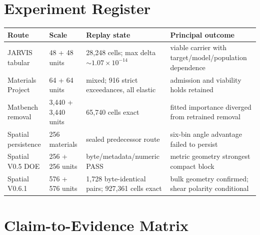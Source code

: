 \documentclass[11pt,a4paper,oneside]{report}
\begin{document}
\clearpage
\appendix

\chapter{Experiment Register}

\begin{longtable}{p{}p{}p{}p{}}
\toprule
Route & Scale & Replay state & Principal outcome \\
\midrule
JARVIS tabular & 48 + 48 units & 28,248 cells; max delta $\sim1.07\times10^{-14}$ & viable carrier with target/model/population dependence \\
Materials Project & 64 + 64 units & mixed; 916 strict exceedances, all elastic & admission and viability holds retained \\
Matbench removal & 3,440 + 3,440 units & 65,740 cells exact & fitted importance diverged from retrained removal \\
Spatial persistence & 256 materials & sealed predecessor route & six-bin angle advantage failed to persist \\
Spatial V0.5 DOE & 256 + 256 units & byte/metadata/numeric PASS & metric geometry strongest compact block \\
Spatial V0.6.1 & 576 + 576 units & 1,728 byte-identical pairs; 927,361 cells exact & bulk geometry confirmed; shear polarity conditional \\
\bottomrule
\end{longtable}

\chapter{Claim-to-Evidence Matrix}
\label{appendix:claim-matrix}
\end{document}
